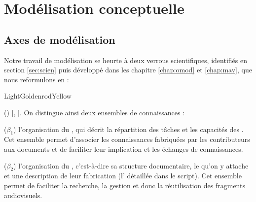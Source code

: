 \section{Modélisation conceptuelle}\label{sec:concept}

\subsection{Axes de modélisation}
Notre travail de modélisation se heurte à deux verrous scientifiques, identifiés en section \ref{sec:scien} puis développé dans les chapitre \ref{chap:omod} et \ref{chap:mav}, que nous reformulons en : 


\begin{problemes}{LightGoldenrodYellow}
\begin{liste}
 	\item[(\g{$\beta$})]  [, ]. 
 	On distingue ainsi deux ensembles de connaissances : 
 	\begin{listeni} 
 		\item[($\beta_1$)] l'organisation du , qui décrit la répartition des tâches et  les capacités des .
 		Cet ensemble permet d'associer les connaissances fabriquées par les contributeurs aux documents et de faciliter leur implication et les échanges de connaissances.
 		
 		\item[($\beta_2$)] l'organisation du , c'est-à-dire sa structure documentaire, le  qu'on y attache et une description de leur fabrication (l' détaillée dans le script).
 		Cet ensemble permet de faciliter la recherche, la gestion et donc la réutilisation des fragments audiovisuels.
 	\end{listeni}


\end{liste}
\end{problemes}
